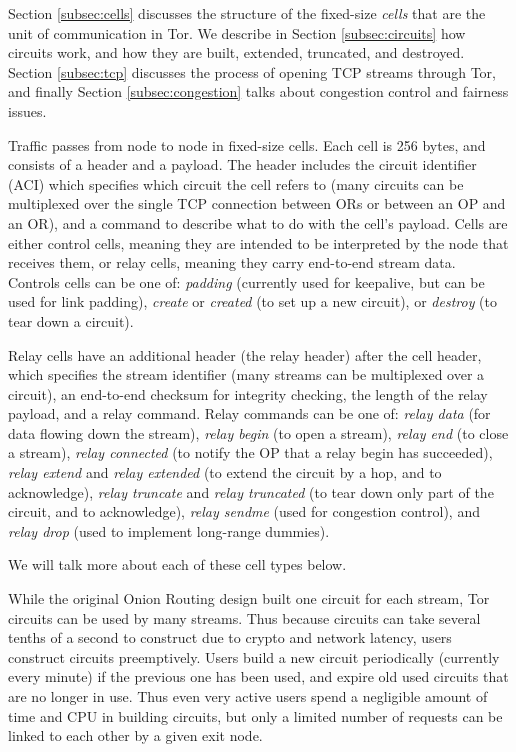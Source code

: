 \documentclass[times,10pt,twocolumn]{article}
\begin{document}
Section \ref{subsec:cells} discusses the structure of the fixed-size
\emph{cells} that are the unit of communication in Tor. We describe
in Section \ref{subsec:circuits} how circuits work, and how they are
built, extended, truncated, and destroyed. Section \ref{subsec:tcp}
discusses the process of opening TCP streams through Tor, and finally
Section \ref{subsec:congestion} talks about congestion control and
fairness issues.

\label{subsec:cells}

Traffic passes from node to node in fixed-size cells. Each cell is 256
bytes, and consists of a header and a payload. The header includes the
circuit identifier (ACI) which specifies which circuit the cell refers to
(many circuits can be multiplexed over the single TCP connection between
ORs or between an OP and an OR), and a command to describe what to do
with the cell's payload. Cells are either control cells, meaning they are
intended to be interpreted by the node that receives them, or relay cells,
meaning they carry end-to-end stream data. Controls cells can be one of:
\emph{padding} (currently used for keepalive, but can be used for link
padding), \emph{create} or \emph{created} (to set up a new circuit),
or \emph{destroy} (to tear down a circuit).

Relay cells have an additional header (the relay header) after the
cell header, which specifies the stream identifier (many streams can
be multiplexed over a circuit), an end-to-end checksum for integrity
checking, the length of the relay payload, and a relay command. Relay
commands can be one of: \emph{relay
data} (for data flowing down the stream), \emph{relay begin} (to open a
stream), \emph{relay end} (to close a stream), \emph{relay connected}
(to notify the OP that a relay begin has succeeded), \emph{relay
extend} and \emph{relay extended} (to extend the circuit by a hop,
and to acknowledge), \emph{relay truncate} and \emph{relay truncated}
(to tear down only part of the circuit, and to acknowledge), \emph{relay
sendme} (used for congestion control), and \emph{relay drop} (used to
implement long-range dummies).

We will talk more about each of these cell types below.


\label{subsec:circuits}

While the original Onion Routing design built one circuit for each stream,
Tor circuits can be used by many streams. Thus because circuits can
take several tenths of a second to construct due to crypto and network
latency, users construct circuits preemptively. Users build a new circuit
periodically (currently every minute) if the previous one has been used,
and expire old used circuits that are no longer in use. Thus even very
active users spend a negligible amount of time and CPU in building
circuits, but only a limited number of requests can be linked to each
other by a given exit node.
\end{document}
